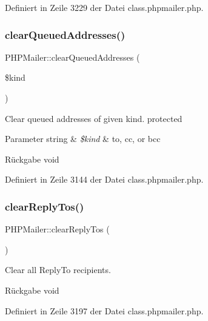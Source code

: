Definiert in Zeile 3229 der Datei class.\+phpmailer.\+php.

\mbox{\label{class_p_h_p_mailer_a3bcade00083c362409865a2c1125cb7e}} 
\subsubsection{\texorpdfstring{clear\+Queued\+Addresses()}{clearQueuedAddresses()}}
{\footnotesize\ttfamily P\+H\+P\+Mailer\+::clear\+Queued\+Addresses (\begin{DoxyParamCaption}\item[{}]{\$kind }\end{DoxyParamCaption})}

Clear queued addresses of given kind.  protected 
\begin{DoxyParams}[1]{Parameter}
string & {\em \$kind} & \textquotesingle{}to\textquotesingle{}, \textquotesingle{}cc\textquotesingle{}, or \textquotesingle{}bcc\textquotesingle{} \\
\hline
\end{DoxyParams}
\begin{DoxyReturn}{Rückgabe}
void 
\end{DoxyReturn}


Definiert in Zeile 3144 der Datei class.\+phpmailer.\+php.

\mbox{\label{class_p_h_p_mailer_a7708faed307f7ab6754cf0fc3e70abd0}} 
\subsubsection{\texorpdfstring{clear\+Reply\+Tos()}{clearReplyTos()}}
{\footnotesize\ttfamily P\+H\+P\+Mailer\+::clear\+Reply\+Tos (\begin{DoxyParamCaption}{ }\end{DoxyParamCaption})}

Clear all Reply\+To recipients. \begin{DoxyReturn}{Rückgabe}
void 
\end{DoxyReturn}


Definiert in Zeile 3197 der Datei class.\+phpmailer.\+php.

